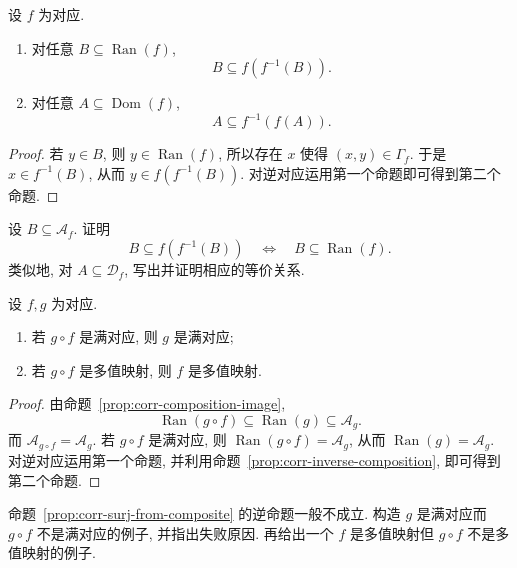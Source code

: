 \documentclass[usesamecnt, thmcnt=section, lang=cn, newtx, 10pt, scheme=chinese]{elegantbook}
\begin{document}
\begin{proposition}\label{prop:corr-surj-multi-closures}
设 $f$ 为对应.
\begin{enumerate}[label=\rm(\arabic*)]
  \item 对任意 $B\subseteq\operatorname{Ran}(f)$,
  \[
   B\subseteq f(f^{-1}(B)).
  \]
  \item 对任意 $A\subseteq\operatorname{Dom}(f)$,
  \[
   A\subseteq f^{-1}(f(A)).
  \]
\end{enumerate}
\end{proposition}

\begin{proof}
若 $y\in B$, 则 $y\in\operatorname{Ran}(f)$, 所以存在 $x$ 使得 $(x,y)\in\Gamma_f$. 于是 $x\in f^{-1}(B)$, 从而 $y\in f(f^{-1}(B))$. 对逆对应运用第一个命题即可得到第二个命题.
\end{proof}

\begin{exercise}\label{ex:corr-surj-multi-closures}
设 $B\subseteq\mathscr A_f$. 证明
\[
 B\subseteq f(f^{-1}(B))
 \quad\Leftrightarrow\quad
 B\subseteq\operatorname{Ran}(f).
\]
类似地, 对 $A\subseteq\mathscr D_f$, 写出并证明相应的等价关系.
\end{exercise}

\begin{proposition}\label{prop:corr-surj-from-composite}
设 $f,g$ 为对应.
\begin{enumerate}[label=\rm(\arabic*)]
  \item 若 $g\circ f$ 是满对应, 则 $g$ 是满对应;
  \item 若 $g\circ f$ 是多值映射, 则 $f$ 是多值映射.
\end{enumerate}
\end{proposition}

\begin{proof}
由命题~\ref{prop:corr-composition-image},
\[
 \operatorname{Ran}(g\circ f)\subseteq\operatorname{Ran}(g)\subseteq\mathscr A_g.
\]
而 $\mathscr A_{g\circ f}=\mathscr A_g$. 若 $g\circ f$ 是满对应, 则 $\operatorname{Ran}(g\circ f)=\mathscr A_g$, 从而 $\operatorname{Ran}(g)=\mathscr A_g$. 对逆对应运用第一个命题, 并利用命题~\ref{prop:corr-inverse-composition}, 即可得到第二个命题.
\end{proof}

\begin{exercise}\label{ex:corr-surj-from-composite}
命题~\ref{prop:corr-surj-from-composite} 的逆命题一般不成立. 构造 $g$ 是满对应而 $g\circ f$ 不是满对应的例子, 并指出失败原因. 再给出一个 $f$ 是多值映射但 $g\circ f$ 不是多值映射的例子.
\end{exercise}
\end{document}
